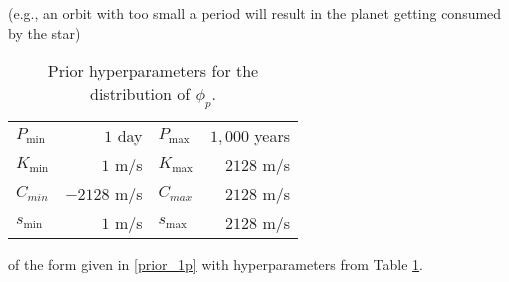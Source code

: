 (e.g., an orbit with too small a period will result in the planet
getting consumed by the star) \citep{bullard2009edc}
\begin{table}[h]
  \begin{center}
  \begin{tabular}{|lr|lr|} \hline \hline
$P_{\min}$ &  $1$ day &
$P_{\max}$ &  $1,000$ years \\
$K_{\min}$ &  $ 1$ m/s & 
$K_{\max}$ &  $2128$ m/s \\
$C_{min}$ &  $-2128$ m/s & 
$C_{max}$ &   $2128$ m/s \\
$s_{\min}$ &  $1$ m/s &
$s_{\max}$ &  $2128$ m/s \\ \hline
  \end{tabular}
  \end{center}
\caption{Prior hyperparameters for the distribution of $\phi_p$.}
\label{tab:hyper}
\end{table}
 of the form given in \ref{prior_1p}
with hyperparameters from Table \ref{tab:hyper}.
